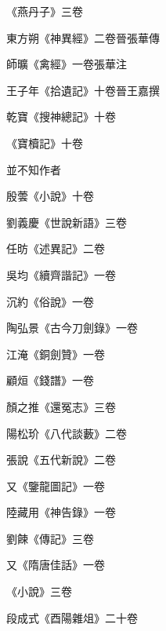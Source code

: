 
\begin{pinyinscope}

 《燕丹子》三卷



 東方朔《神異經》二卷晉張華傳



 師曠《禽經》一卷張華注



 王子年《拾遺記》十卷晉王嘉撰



 乾寶《搜神總記》十卷



 《寶櫝記》十卷



 並不知作者



 殷蕓《小說》十卷



 劉義慶《世說新語》三卷



 任昉《述異記》二卷



 吳均《續齊諧記》一卷



 沉約《俗說》一卷



 陶弘景《古今刀劍錄》一卷



 江淹《銅劍贊》一卷



 顧烜《錢譜》一卷



 顏之推《還冤志》三卷



 陽松玠《八代談藪》二卷



 張說《五代新說》二卷



 又《鑒龍圖記》一卷



 陸藏用《神告錄》一卷



 劉餗《傳記》三卷



 又《隋唐佳話》一卷



 《小說》三卷



 段成式《酉陽雜俎》二十卷




\end{pinyinscope}
